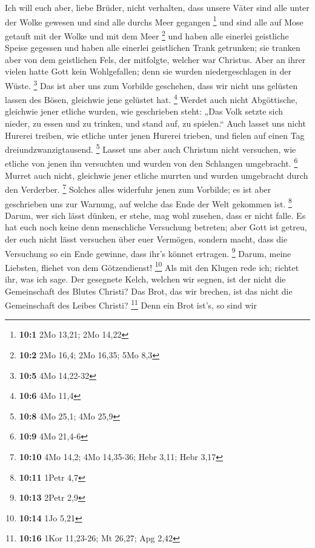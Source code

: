  Ich will euch aber, liebe Brüder, nicht verhalten, dass
unsere Väter sind alle unter der Wolke gewesen und sind alle durchs Meer
gegangen \footnote{\textbf{10:1} 2Mo 13,21; 2Mo 14,22} 
und sind alle auf Mose getauft mit der Wolke und mit dem Meer
\footnote{\textbf{10:2} 2Mo 16,4; 2Mo 16,35; 5Mo 8,3}  und
haben alle einerlei geistliche Speise gegessen  und haben
alle einerlei geistlichen Trank getrunken; sie tranken aber von dem
geistlichen Fels, der mitfolgte, welcher war Christus. 
Aber an ihrer vielen hatte Gott kein Wohlgefallen; denn sie wurden
niedergeschlagen in der Wüste. \footnote{\textbf{10:5} 4Mo 14,22-32}
 Das ist aber uns zum Vorbilde geschehen, dass wir nicht
uns gelüsten lassen des Bösen, gleichwie jene gelüstet hat. \footnote{\textbf{10:6}
  4Mo 11,4}  Werdet auch nicht Abgöttische, gleichwie
jener etliche wurden, wie geschrieben steht: „Das Volk setzte sich
nieder, zu essen und zu trinken, und stand auf, zu spielen.``
 Auch lasset uns nicht Hurerei treiben, wie etliche unter
jenen Hurerei trieben, und fielen auf einen Tag dreiundzwanzigtausend.
\footnote{\textbf{10:8} 4Mo 25,1; 4Mo 25,9}  Lasset uns
aber auch Christum nicht versuchen, wie etliche von jenen ihn versuchten
und wurden von den Schlangen umgebracht. \footnote{\textbf{10:9} 4Mo
  21,4-6}  Murret auch nicht, gleichwie jener etliche
murrten und wurden umgebracht durch den Verderber. \footnote{\textbf{10:10}
  4Mo 14,2; 4Mo 14,35-36; Hebr 3,11; Hebr 3,17}  Solches
alles widerfuhr jenen zum Vorbilde; es ist aber geschrieben uns zur
Warnung, auf welche das Ende der Welt gekommen ist. \footnote{\textbf{10:11}
  1Petr 4,7}  Darum, wer sich lässt dünken, er stehe, mag
wohl zusehen, dass er nicht falle.  Es hat euch noch
keine denn menschliche Versuchung betreten; aber Gott ist getreu, der
euch nicht lässt versuchen über euer Vermögen, sondern macht, dass die
Versuchung so ein Ende gewinne, dass ihr's könnet ertragen. \footnote{\textbf{10:13}
  2Petr 2,9}  Darum, meine Liebsten, fliehet von dem
Götzendienst! \footnote{\textbf{10:14} 1Jo 5,21}  Als mit
den Klugen rede ich; richtet ihr, was ich sage.  Der
gesegnete Kelch, welchen wir segnen, ist der nicht die Gemeinschaft des
Blutes Christi? Das Brot, das wir brechen, ist das nicht die
Gemeinschaft des Leibes Christi? \footnote{\textbf{10:16} 1Kor 11,23-26;
  Mt 26,27; Apg 2,42}  Denn ein Brot ist's, so sind wir
